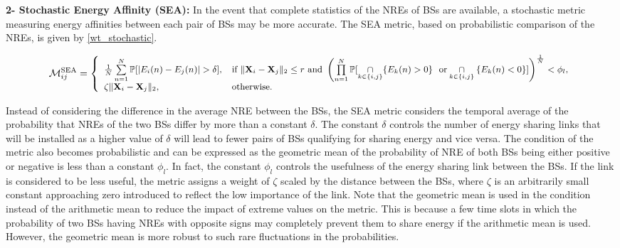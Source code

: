 \documentclass[10pt, letter,twocolumn]{IEEEtran}
\begin{document}
\textbf{2- Stochastic Energy Affinity (SEA):} In the event that complete statistics of the NREs of BSs are available, a stochastic metric measuring energy affinities between each pair of BSs may be more accurate. The SEA metric, based on probabilistic comparison of the NREs, is given by \eqref{wt_stochastic}.
\begin{figure*}
      \begin{equation}\label{wt_stochastic}
\small
      \mathcal{M}^{\text{SEA}}_{ij} =
      \left\{
    	\begin{array}{ll}
            \frac{1}{N} \sum \limits_{n=1}^{N} \mathbb{P}[|E_{i}(n) - E_{j}(n)| > \delta], &  \mbox{if } \|\mathbf{X}_{i} - \mathbf{X}_{j}\|_{2} \leq r \text{ and }  \left(\prod \limits_{n=1}^{N }\mathbb{P}[ \underset{k \in \{i,j\}}{\cap} \{ {E}_{k}(n) > 0 \} \ \ \text{or} \underset{k \in \{i,j\}}{\cap} \{ {E}_{k}(n) < 0 \}] \right)^{\frac{1}{N}} < \phi_{l}, \\
            \zeta \|\mathbf{X}_{i} - \mathbf{X}_{j}\|_{2},  & \mbox{otherwise}.
      \end{array}
      \right.
      \end{equation}
\end{figure*}
Instead of considering the difference in the average NRE between the BSs, the SEA metric considers the temporal average of the probability that NREs of the two BSs differ by more than a constant $\delta$. The constant $\delta$ controls the number of energy sharing links that will be installed as a higher value of $\delta$ will lead to fewer pairs of BSs qualifying for sharing energy and vice versa. The condition of the metric also becomes probabilistic and can be expressed as the geometric mean of the probability of NRE of both BSs being either positive or negative is less than a constant $\phi_{l}$. In fact, the constant $\phi_{l}$ controls the usefulness of the energy sharing link between the BSs. If the link is considered to be less useful, the metric assigns a weight of $\zeta$ scaled by the distance between the BSs, where $\zeta$ is an arbitrarily small constant approaching zero introduced to reflect the low importance of the link. Note that the geometric mean is used in the condition instead of the arithmetic mean to reduce the impact of extreme values on the metric. This is because a few time slots in which the probability of two BSs having NREs with opposite signs may completely prevent them to share energy if the arithmetic mean is used. However, the geometric mean is more robust to such rare fluctuations in the probabilities.
\end{document}
